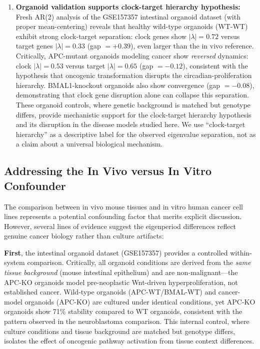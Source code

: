 \documentclass[11pt,a4paper]{article}
\begin{document}
\begin{enumerate}
    \item \textbf{Organoid validation supports clock-target hierarchy hypothesis:} Fresh AR(2) analysis of the GSE157357 intestinal organoid dataset (with proper mean-centering) reveals that healthy wild-type organoids (WT-WT) exhibit strong clock-target separation: clock genes show $|\lambda| = 0.72$ versus target genes $|\lambda| = 0.33$ (gap $= +0.39$), even larger than the in vivo reference. Critically, APC-mutant organoids modeling cancer show \textit{reversed} dynamics: clock $|\lambda| = 0.53$ versus target $|\lambda| = 0.65$ (gap $= -0.12$), consistent with the hypothesis that oncogenic transformation disrupts the circadian-proliferation hierarchy. BMAL1-knockout organoids also show convergence (gap $= -0.08$), demonstrating that clock gene disruption alone can collapse this separation. These organoid controls, where genetic background is matched but genotype differs, provide mechanistic support for the clock-target hierarchy hypothesis and its disruption in the disease models studied here. We use ``clock-target hierarchy'' as a descriptive label for the observed eigenvalue separation, not as a claim about a universal biological mechanism.
\end{enumerate}

\subsection{Addressing the In Vivo versus In Vitro Confounder}

The comparison between in vivo mouse tissues and in vitro human cancer cell lines represents a potential confounding factor that merits explicit discussion. However, several lines of evidence suggest the eigenperiod differences reflect genuine cancer biology rather than culture artifacts:

\textbf{First}, the intestinal organoid dataset (GSE157357) provides a controlled within-system comparison. Critically, all organoid conditions are derived from the \textit{same tissue background} (mouse intestinal epithelium) and are non-malignant---the APC-KO organoids model pre-neoplastic Wnt-driven hyperproliferation, not established cancer. Wild-type organoids (APC-WT/BMAL-WT) and cancer-model organoids (APC-KO) are cultured under identical conditions, yet APC-KO organoids show 71\% stability compared to WT organoids, consistent with the pattern observed in the neuroblastoma comparison. This internal control, where culture conditions and tissue background are matched but genotype differs, isolates the effect of oncogenic pathway activation from tissue context differences.
\end{document}
